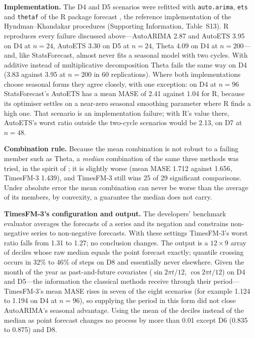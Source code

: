 \documentclass[ASNA]{USG}
\newcommand{\pkg}[1]{\textsf{#1}}
\newcommand{\proglang}[1]{\textsf{#1}}
\newcommand{\code}[1]{\texttt{#1}}
\begin{document}
\textbf{Implementation.} The D4 and D5 scenarios were refitted with \code{auto.arima}, \code{ets} and
\code{thetaf} of the \proglang{R} package \pkg{forecast} \citep{hyndman2008forecast}, the reference
implementation of the Hyndman--Khandakar procedures (Supporting Information, Table~S13). R reproduces every
failure discussed above---AutoARIMA 2.87 and AutoETS 3.95 on D4 at $n = 24$, AutoETS 3.30 on D5 at $n = 24$,
Theta 4.09 on D4 at $n = 200$---and, like \pkg{StatsForecast}, almost never fits a seasonal model with two
cycles. With additive instead of multiplicative decomposition Theta fails the same way on D4 (3.83 against
3.95 at $n = 200$ in 60 replications). Where both implementations choose seasonal forms they agree closely,
with one exception: on D4 at $n = 96$ \pkg{StatsForecast}'s AutoETS has a mean MASE of 2.41 against 1.04 for R,
because its optimiser settles on a near-zero seasonal smoothing parameter where R finds a high one. That scenario
is an implementation failure; with R's value there, AutoETS's worst ratio outside the two-cycle scenarios would
be 2.13, on D7 at $n = 48$.

\textbf{Combination rule.} Because the mean combination is not robust to a failing member such as Theta, a
\emph{median} combination of the same three methods was tried, in the spirit of \citet{petropoulos2020scum};
it is slightly worse (mean MASE 1.712 against 1.656, TimesFM-3 1.439), and TimesFM-3 still wins 25 of 29
significant comparisons. Under absolute error the mean combination can never be worse than the average of its
members, by convexity, a guarantee the median does not carry.

\textbf{TimesFM-3's configuration and output.} The developers' benchmark evaluator averages the forecasts of
a series and its negation and constrains non-negative series to non-negative forecasts. With these settings
TimesFM-3's worst ratio falls from 1.31 to 1.27; no conclusion changes. The output is a $12 \times 9$ array of
deciles whose raw median equals the point forecast exactly; quantile crossing occurs in 32\% to 46\% of steps
on D8 and essentially never elsewhere. Given the month of the year as past-and-future covariates
($\sin 2\pi t/12$, $\cos 2\pi t/12$) on D4 and D5---the information the classical methods receive through
their period---TimesFM-3's mean MASE rises in seven of the eight scenarios (for example 1.124 to 1.194 on D4 at
$n = 96$), so supplying the period in this form did not close AutoARIMA's seasonal advantage. Using the mean
of the deciles instead of the median as point forecast changes no process by more than 0.01 except D6 (0.835
to 0.875) and D8.
\end{document}
